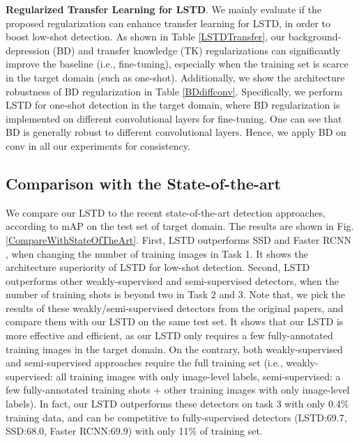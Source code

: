 \documentclass[letterpaper]{article} \usepackage{aaai18}  \usepackage{times}  \usepackage{helvet}  \usepackage{courier}  \usepackage{url}  \usepackage{graphicx}
\begin{document}
\textbf{Regularized Transfer Learning for LSTD}.
We mainly evaluate if the proposed regularization can enhance transfer learning for LSTD,
in order to boost low-shot detection.
As shown in Table \ref{LSTDTransfer},
our background-depression (BD) and transfer knowledge (TK) regularizations can significantly improve the baseline (i.e., fine-tuning),
especially when the training set is scarce in the target domain (such as one-shot).
Additionally,
we show the architecture robustness of BD regularization in Table \ref{BDdiffconv}.
Specifically,
we perform LSTD for one-shot detection in the target domain,
where
BD regularization is implemented on different convolutional layers for fine-tuning.
One can see that BD is generally robust to different convolutional layers.
Hence,
we apply BD on conv in all our experiments for consistency.


\subsection{Comparison with the State-of-the-art}
We compare our LSTD to the recent state-of-the-art detection approaches,
according to mAP on the test set of target domain.
The results are shown in Fig. \ref{CompareWithStateOfTheArt}.
First,
LSTD outperforms SSD \cite{Liueccv2016} and Faster RCNN \cite{Renpami2016},
when changing the number of training images in Task 1.
It shows the architecture superiority of LSTD for low-shot detection.
Second,
LSTD outperforms other weakly-supervised \cite{wang2014weakly,teh2016attention,kantorov2016contextlocnet,bilen2016weaklyddn,li2016weakly,diba2016weakly,cinbis2017} and
semi-supervised \cite{dong2017few} detectors,
when the number of training shots is beyond two in Task 2 and 3.
Note that,
we pick the results of these weakly/semi-supervised detectors from the original papers,
and compare them with our LSTD on the same test set.
It shows that our LSTD is more effective and efficient,
as our LSTD only requires a few fully-annotated training images in the target domain. On the contrary,
both weakly-supervised and semi-supervised approaches require the full training set
(i.e.,
weakly-supervised: all training images with only image-level labels,
semi-supervised: a few fully-annotated training shots + other training images with only image-level labels).
In fact,
our LSTD outperforms these detectors on task 3 with only 0.4\% training data,
and can be competitive to fully-supervised detectors (LSTD:69.7, SSD:68.0, Faster RCNN:69.9) with only 11\% of training set.
\end{document}
